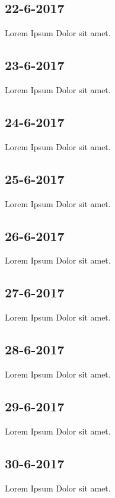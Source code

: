\documentclass{uva-inf-article}
\begin{document}
\subsection{22-6-2017}
Lorem Ipsum Dolor sit amet.
\subsection{23-6-2017}
Lorem Ipsum Dolor sit amet.
\subsection{24-6-2017}
Lorem Ipsum Dolor sit amet.
\subsection{25-6-2017}
Lorem Ipsum Dolor sit amet.
\subsection{26-6-2017}
Lorem Ipsum Dolor sit amet.
\subsection{27-6-2017}
Lorem Ipsum Dolor sit amet.
\subsection{28-6-2017}
Lorem Ipsum Dolor sit amet.
\subsection{29-6-2017}
Lorem Ipsum Dolor sit amet.
\subsection{30-6-2017}
Lorem Ipsum Dolor sit amet.
\end{document}
